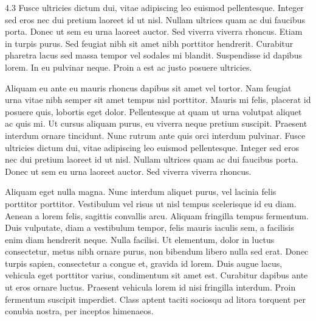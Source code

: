\documentclass[a0]{a0poster}
\begin{document}
\framethin
\begin{area4}{4.3}
Fusce ultricies dictum dui, vitae adipiscing leo euismod pellentesque. Integer sed eros nec dui pretium laoreet id ut nisl. Nullam ultrices quam ac dui faucibus porta. Donec ut sem eu urna laoreet auctor. Sed viverra viverra rhoncus. Etiam in turpis purus. Sed feugiat nibh sit amet nibh porttitor hendrerit. Curabitur pharetra lacus sed massa tempor vel sodales mi blandit. Suspendisse id dapibus lorem. In eu pulvinar neque. Proin a est ac justo posuere ultricies.

Aliquam eu ante eu mauris rhoncus dapibus sit amet vel tortor. Nam feugiat urna vitae nibh semper sit amet tempus nisl porttitor. Mauris mi felis, placerat id posuere quis, lobortis eget dolor. Pellentesque at quam ut urna volutpat aliquet ac quis mi. Ut cursus aliquam purus, eu viverra neque pretium suscipit. Praesent interdum ornare tincidunt. Nunc rutrum ante quis orci interdum pulvinar. Fusce ultricies dictum dui, vitae adipiscing leo euismod pellentesque. Integer sed eros nec dui pretium laoreet id ut nisl. Nullam ultrices quam ac dui faucibus porta. Donec ut sem eu urna laoreet auctor. Sed viverra viverra rhoncus. 

Aliquam eget nulla magna. Nunc interdum aliquet purus, vel lacinia felis porttitor porttitor. Vestibulum vel risus ut nisl tempus scelerisque id eu diam. Aenean a lorem felis, sagittis convallis arcu. Aliquam fringilla tempus fermentum. Duis vulputate, diam a vestibulum tempor, felis mauris iaculis sem, a facilisis enim diam hendrerit neque. Nulla facilisi. Ut elementum, dolor in luctus consectetur, metus nibh ornare purus, non bibendum libero nulla sed erat. Donec turpis sapien, consectetur a congue et, gravida id lorem. Duis augue lacus, vehicula eget porttitor varius, condimentum sit amet est. Curabitur dapibus ante ut eros ornare luctus. Praesent vehicula lorem id nisi fringilla interdum. Proin fermentum suscipit imperdiet. Class aptent taciti sociosqu ad litora torquent per conubia nostra, per inceptos himenaeos.

\end{area4}
\end{document}
